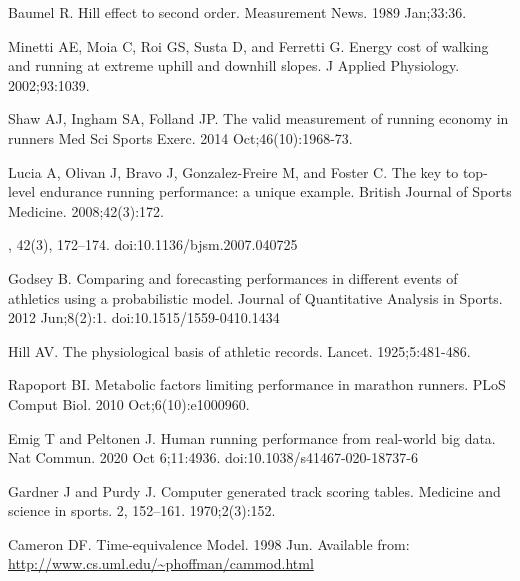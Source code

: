 \documentclass[10pt,letterpaper]{article}
\begin{document}
\begin{thebibliography}{1}


Baumel R. Hill effect to second order.
    Measurement News. 
    1989 Jan;33:36.

      Minetti AE, Moia C, Roi GS, Susta D, and Ferretti G.
      Energy cost of walking and running at extreme uphill and downhill slopes.
      J Applied Physiology.
      2002;93:1039.

      Shaw AJ, Ingham SA, Folland JP.
      The valid measurement of running economy in runners 
       Med Sci Sports Exerc.
       2014 Oct;46(10):1968-73.

      Lucia A, Olivan J, Bravo J, Gonzalez-Freire M, and Foster C.
      The key to top-level endurance running performance: a unique example.
      British Journal of Sports Medicine.
      2008;42(3):172.

, 42(3), 172–174. doi:10.1136/bjsm.2007.040725 

 Godsey B. Comparing and forecasting performances in different events of athletics using a probabilistic model.
        Journal of Quantitative Analysis in Sports.
        2012 Jun;8(2):1. doi:10.1515/1559-0410.1434

 Hill AV. The physiological basis of athletic records. 
         Lancet. 1925;5:481-486.

 Rapoport BI. Metabolic factors limiting performance in marathon runners.
      PLoS Comput Biol.
       2010 Oct;6(10):e1000960.

 Emig T and Peltonen J. Human running performance from real-world big data.
        Nat Commun.
        2020 Oct 6;11:4936.
        doi:10.1038/s41467-020-18737-6

 Gardner J and Purdy J. Computer generated track scoring tables.
        Medicine and science in sports. 2, 152–161.
        1970;2(3):152.

     Cameron DF. Time-equivalence Model. 
     1998 Jun.
     Available from: \url{http://www.cs.uml.edu/~phoffman/cammod.html}




\end{thebibliography}
\end{document}
